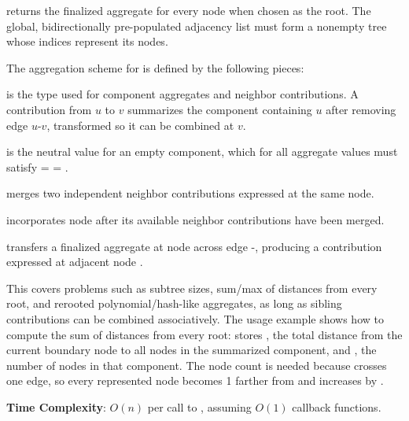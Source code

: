 \begin{compactitem}
  \item {} returns the finalized aggregate for every node when chosen as the root. The global, bidirectionally pre-populated adjacency list  must form a nonempty tree whose indices represent its nodes.
\end{compactitem}

The aggregation scheme for  is defined by the following pieces:

\begin{compactitem}
  \item {} is the type used for component aggregates and neighbor contributions. A contribution from $u$ to $v$ summarizes the component containing $u$ after removing edge $u$-$v$, transformed so it can be combined at $v$.
  \item {} is the neutral value for an empty component, which for all aggregate values  must satisfy  =  = .
  \item {} merges two independent neighbor contributions expressed at the same node.
  \item {} incorporates node  after its available neighbor contributions have been merged.
  \item {} transfers a finalized aggregate at node  across edge -, producing a contribution expressed at adjacent node .
\end{compactitem}

This covers problems such as subtree sizes, sum/max of distances from every root, and rerooted polynomial/hash-like aggregates, as long as sibling contributions can be combined associatively. The usage example shows how to compute the sum of distances from every root:  stores , the total distance from the current boundary node to all nodes in the summarized component, and , the number of nodes in that component. The node count is needed because  crosses one edge, so every represented node becomes 1 farther from  and  increases by .

\textbf{Time Complexity}: $O(n)$ per call to , assuming $O(1)$ callback functions.

